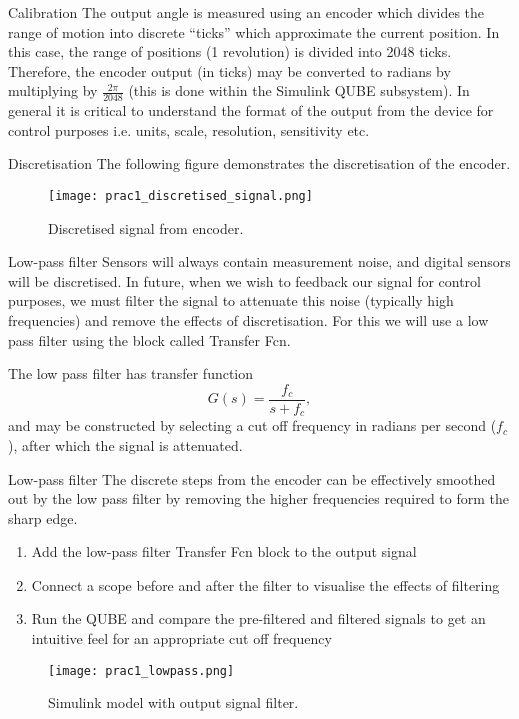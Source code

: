 \documentclass[9pt]{beamer-control}
\begin{document}
\begin{frame}{Calibration}
	The output angle is measured using an encoder which divides the range of motion into discrete ``ticks” which approximate the current position. In this case, the range of positions (1 revolution) is divided into 2048 ticks. Therefore, the encoder output (in ticks) may be converted to radians by multiplying by $\tfrac{2\pi}{2048}$ (this is done within the Simulink QUBE subsystem). In general it is critical to understand the format of the output from the device for control purposes i.e. units, scale, resolution, sensitivity etc. 
\end{frame}

\begin{frame}{Discretisation}
	The following figure demonstrates the discretisation of the encoder.
	\begin{figure}
		\centering
		\texttt{[image: prac1\_discretised\_signal.png]}
		\caption{Discretised signal from encoder.}
	\end{figure}
	
\end{frame}



\begin{frame}{Low-pass filter}
Sensors will always contain measurement noise, and digital sensors will be discretised. In future, when we wish to feedback our signal for control purposes, we must filter the signal to attenuate this noise (typically high frequencies) and remove the effects of discretisation. For this we will use a low pass filter using the block called Transfer Fcn. 

The low pass filter has transfer function
\[
G(s) = \frac{f_c}{s+f_c},
\]
and may be constructed by selecting a cut off frequency in radians per second ($f_c$), after which the signal is attenuated.

\end{frame}


\begin{frame}{Low-pass filter}
The discrete steps from the encoder can be effectively smoothed out by the low pass filter by removing the higher frequencies required to form the sharp edge. 
\begin{enumerate}
	\item Add the low-pass filter Transfer Fcn block to the output signal
	\item Connect a scope before and after the filter to visualise the effects of filtering
	\item Run the QUBE and compare the pre-filtered and filtered signals to get an intuitive feel for an appropriate cut off frequency
\end{enumerate}
 
 \begin{figure}
 	\centering
 	\texttt{[image: prac1\_lowpass.png]}
 	\caption{Simulink model with output signal filter.}
 \end{figure}
\end{frame}
\end{document}
